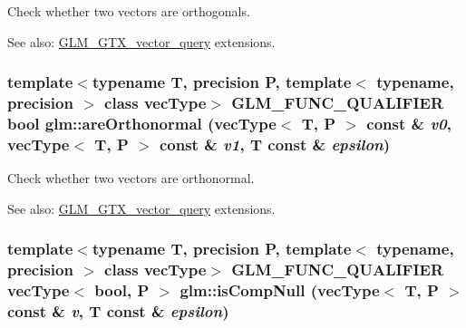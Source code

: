 Check whether two vectors are orthogonals. \begin{Desc}
\item[See also:]\hyperlink{group__gtx__vector__query}{GLM\_\-GTX\_\-vector\_\-query} extensions. \end{Desc}
\hypertarget{group__gtx__vector__query_g78e84684059effca3c44c549476db51a}{
\subsubsection[areOrthonormal]{\setlength{\rightskip}{0pt plus 5cm}template$<$typename T, precision P, template$<$ typename, precision $>$ class vecType$>$ GLM\_\-FUNC\_\-QUALIFIER bool glm::areOrthonormal (vecType$<$ T, P $>$ const \& {\em v0}, \/  vecType$<$ T, P $>$ const \& {\em v1}, \/  T const \& {\em epsilon})}}
\label{group__gtx__vector__query_g78e84684059effca3c44c549476db51a}


Check whether two vectors are orthonormal. \begin{Desc}
\item[See also:]\hyperlink{group__gtx__vector__query}{GLM\_\-GTX\_\-vector\_\-query} extensions. \end{Desc}
\hypertarget{group__gtx__vector__query_g91e10972d2d748d78f0a5f6234f8b088}{
\subsubsection[isCompNull]{\setlength{\rightskip}{0pt plus 5cm}template$<$typename T, precision P, template$<$ typename, precision $>$ class vecType$>$ GLM\_\-FUNC\_\-QUALIFIER vecType$<$ bool, P $>$ glm::isCompNull (vecType$<$ T, P $>$ const \& {\em v}, \/  T const \& {\em epsilon})}}
\label{group__gtx__vector__query_g91e10972d2d748d78f0a5f6234f8b088}


